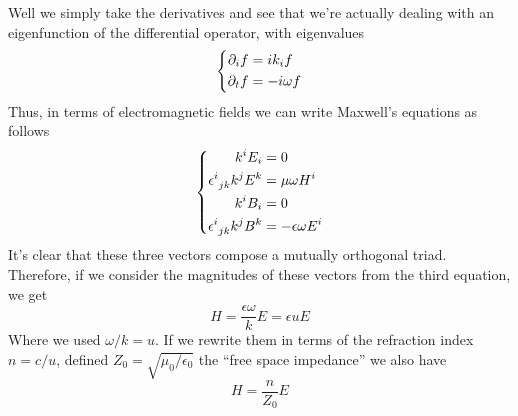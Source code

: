 \documentclass[../electromagnetism.tex]{subfiles}
\begin{document}
Well we simply take the derivatives and see that we're actually dealing with an eigenfunction of the differential operator, with eigenvalues
\begin{equation}
	\left\{ \begin{aligned}
		\partial_if&= ik_if\\
		\partial_tf&= -i\omega f
\end{aligned}\right.
	\label{eq:eigenwave}
\end{equation}
Thus, in terms of electromagnetic fields we can write Maxwell's equations as follows
\begin{equation}
	\left\{ \begin{aligned}
			k^iE_i&= 0\\
			\epsilon^{i}_{\ jk}k^jE^k&= \mu\omega H^i\\
			k^iB_i&= 0\\
			\epsilon^{i}_{\ jk}k^jB^k&= -\epsilon\omega E^i
	\end{aligned}\right.
	\label{eq:eigenmaxwell}
\end{equation}
It's clear that these three vectors compose a mutually orthogonal triad. Therefore, if we consider the magnitudes of these vectors from the third equation, we get
\begin{equation}
	H=\frac{\epsilon\omega}{k}E=\epsilon uE
	\label{eq:HErelwaves}
\end{equation}
Where we used $\omega/k=u$. If we rewrite them in terms of the refraction index $n=c/u$, defined $Z_0=\sqrt{\mu_0/\epsilon_0}$ the ``free space impedance'' we also have
\begin{equation*}
	H=\frac{n}{Z_0}E
\end{equation*}
\end{document}

